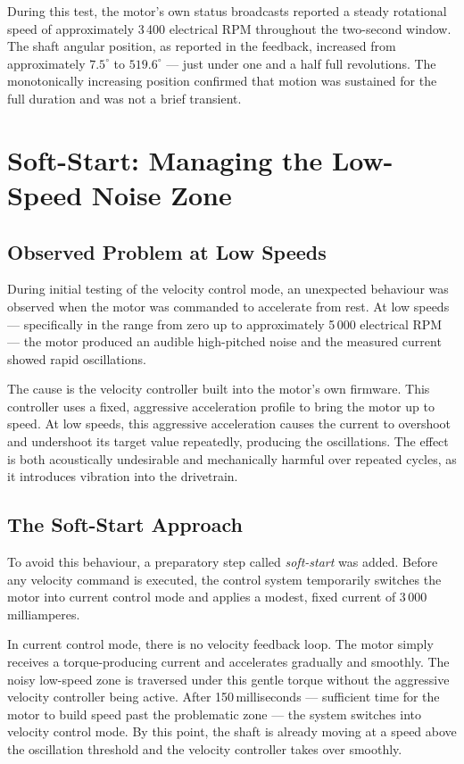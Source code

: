 \documentclass[12pt,a4paper]{article}
\begin{document}
During this test, the motor's own status broadcasts reported a steady
rotational speed of approximately 3\,400 electrical RPM throughout the
two-second window. The shaft angular position, as reported in the feedback,
increased from approximately $7.5^\circ$ to $519.6^\circ$ --- just under
one and a half full revolutions. The monotonically increasing position
confirmed that motion was sustained for the full duration and was not a
brief transient.

\section{Soft-Start: Managing the Low-Speed Noise Zone}
\label{sec:softstart}

\subsection{Observed Problem at Low Speeds}

During initial testing of the velocity control mode, an unexpected behaviour
was observed when the motor was commanded to accelerate from rest. At low
speeds --- specifically in the range from zero up to approximately 5\,000
electrical RPM --- the motor produced an audible high-pitched noise and the
measured current showed rapid oscillations.

The cause is the velocity controller built into the motor's own firmware.
This controller uses a fixed, aggressive acceleration profile to bring the
motor up to speed. At low speeds, this aggressive acceleration causes the
current to overshoot and undershoot its target value repeatedly, producing
the oscillations. The effect is both acoustically undesirable and
mechanically harmful over repeated cycles, as it introduces vibration into
the drivetrain.

\subsection{The Soft-Start Approach}

To avoid this behaviour, a preparatory step called \emph{soft-start} was
added. Before any velocity command is executed, the control system
temporarily switches the motor into current control mode and applies a
modest, fixed current of 3\,000\,milliamperes.

In current control mode, there is no velocity feedback loop. The motor
simply receives a torque-producing current and accelerates gradually and
smoothly. The noisy low-speed zone is traversed under this gentle torque
without the aggressive velocity controller being active. After
150\,milliseconds --- sufficient time for the motor to build speed past
the problematic zone --- the system switches into velocity control mode.
By this point, the shaft is already moving at a speed above the oscillation
threshold and the velocity controller takes over smoothly.
\end{document}
